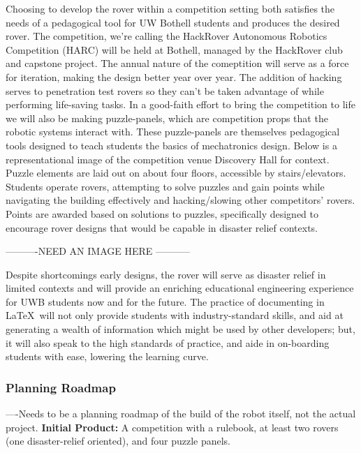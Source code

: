 \documentclass[a4paper, 10pt]{article}
\begin{document}
		Choosing to develop the rover within a competition setting both satisfies the needs of a pedagogical tool for UW Bothell students and produces the desired rover. The competition, we're calling the HackRover Autonomous Robotics Competition (HARC) will be held at Bothell, managed by the HackRover club and capstone project. The annual nature of the comeptition will serve as a force for iteration, making the design better year over year. The addition of hacking serves to penetration test rovers so they can't be taken advantage of while performing life-saving tasks. In a good-faith effort to bring the competition to life we will also be making puzzle-panels, which are competition props that the robotic systems interact with. These puzzle-panels are themselves pedagogical tools designed to teach students the basics of mechatronics design. Below is a representational image of the competition venue Discovery Hall for context. Puzzle elements are laid out on about four floors, accessible by stairs/elevators. Students operate rovers, attempting to solve puzzles and gain points while navigating the building effectively and hacking/slowing other competitors' rovers. Points are awarded based on solutions to puzzles, specifically designed to encourage rover designs that would be capable in disaster relief contexts.
		
		----------NEED  AN IMAGE HERE -----------
	
		Despite shortcomings early designs, the rover will serve as disaster relief in limited contexts and will provide an enriching educational engineering experience for UWB students now and for the future. The practice of documenting in \LaTeX\ will not only provide students with industry-standard skills, and aid at generating a wealth of information which might be used by other developers; but, it will also speak to the high standards of practice, and aide in on-boarding students with ease, lowering the learning curve.
	
		\subsubsection{Planning Roadmap}
		----Needs to be a planning roadmap of the build of the robot itself, not the actual project.
		\textbf{Initial Product:} A competition with a rulebook, at least two rovers (one disaster-relief oriented), and four puzzle panels.
		
\end{document}

